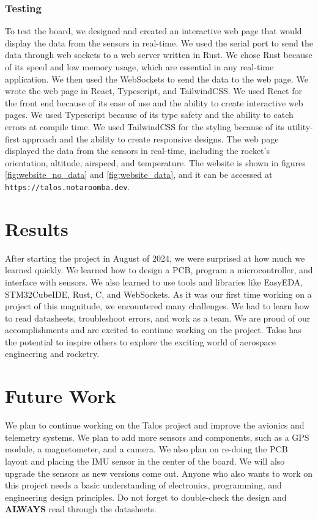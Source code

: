 \documentclass{article}
\begin{document}
\subsubsection{Testing}
To test the board, we designed and created an interactive web page that would display the data from the sensors in real-time. We used the serial port to send the data through web sockets to a web server written in Rust. We chose Rust because of its speed and low memory usage, which are essential in any real-time application. We then used the WebSockets to send the data to the web page. We wrote the web page in React, Typescript, and TailwindCSS. We used React for the front end because of its ease of use and the ability to create interactive web pages. We used Typescript because of its type safety and the ability to catch errors at compile time. We used TailwindCSS for the styling because of its utility-first approach and the ability to create responsive designs. The web page displayed the data from the sensors in real-time, including the rocket's orientation, altitude, airspeed, and temperature. The website is shown in figures \ref{fig:website_no_data} and \ref{fig:website_data}, and it can be accessed at \texttt{https://talos.notaroomba.dev}.

\section{Results}
After starting the project in August of 2024, we were surprised at how much we learned quickly. We learned how to design a PCB, program a microcontroller, and interface with sensors. We also learned to use tools and libraries like EasyEDA, STM32CubeIDE, Rust, C, and WebSockets. As it was our first time working on a project of this magnitude, we encountered many challenges. We had to learn how to read datasheets, troubleshoot errors, and work as a team. We are proud of our accomplishments and are excited to continue working on the project. Talos has the potential to inspire others to explore the exciting world of aerospace engineering and rocketry.

\section{Future Work}
We plan to continue working on the Talos project and improve the avionics and telemetry systems. We plan to add more sensors and components, such as a GPS module, a magnetometer, and a camera. We also plan on re-doing the PCB layout and placing the IMU sensor in the center of the board. We will also upgrade the sensors as new versions come out. Anyone who also wants to work on this project needs a basic understanding of electronics, programming, and engineering design principles. Do not forget to double-check the design and \textbf{ALWAYS} read through the datasheets.
\printbibliography
\end{document}
